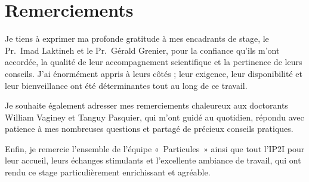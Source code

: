 \chapter*{Remerciements}
{}

Je tiens à exprimer ma profonde gratitude à mes encadrants de stage, 
le Pr.~Imad Laktineh et le Pr.~Gérald Grenier, pour la confiance qu’ils m’ont accordée, 
la qualité de leur accompagnement scientifique et la pertinence de leurs conseils. 
J’ai énormément appris à leurs côtés ; leur exigence, leur disponibilité et leur bienveillance 
ont été déterminantes tout au long de ce travail.

Je souhaite également adresser mes remerciements chaleureux aux doctorants 
William Vaginey et Tanguy Pasquier, qui m’ont guidé au quotidien, 
répondu avec patience à mes nombreuses questions et partagé de précieux conseils pratiques.  

Enfin, je remercie l’ensemble de l’équipe «~Particules~» ainsi que tout l’IP2I 
pour leur accueil, leurs échanges stimulants et l’excellente ambiance de travail, 
qui ont rendu ce stage particulièrement enrichissant et agréable.

